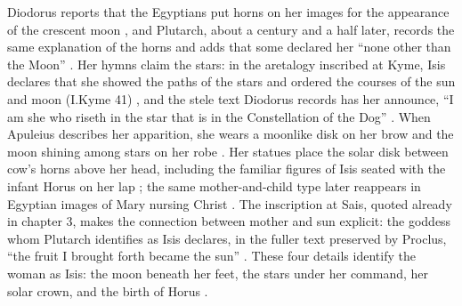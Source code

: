 Diodorus reports that the Egyptians put horns on her images for the appearance of the crescent moon \cite[1.11]{diodorus:library}, and Plutarch, about a century and a half later, records the same explanation of the horns and adds that some declared her ``none other than the Moon'' \cite[52]{plutarch:deiside}.
Her hymns claim the stars: in the aretalogy inscribed at Kyme, Isis declares that she showed the paths of the stars and ordered the courses of the sun and moon (I.Kyme 41) \cite{engelmann:kyme}, and the stele text Diodorus records has her announce, ``I am she who riseth in the star that is in the Constellation of the Dog'' \cite[1.27]{diodorus:library}.
When Apuleius describes her apparition, she wears a moonlike disk on her brow and the moon shining among stars on her robe \cite[11.3--4]{apuleius:metamorphoses}.
Her statues place the solar disk between cow's horns above her head, including the familiar figures of Isis seated with the infant Horus on her lap \cite{met:isis-horus,bm:isis-horus}; the same mother-and-child type later reappears in Egyptian images of Mary nursing Christ \cite{higgins:divine-mothers}.
The inscription at Sais, quoted already in chapter 3, makes the connection between mother and sun explicit: the goddess whom Plutarch identifies as Isis declares, in the fuller text preserved by Proclus, ``the fruit I brought forth became the sun'' \cite[9]{plutarch:deiside}\cite[Book 1, on Timaeus 21e]{proclus:intimaeum}.
These four details identify the woman as Isis: the moon beneath her feet, the stars under her command, her solar crown, and the birth of Horus \cite[185--187]{henten:dragon-myth}.

